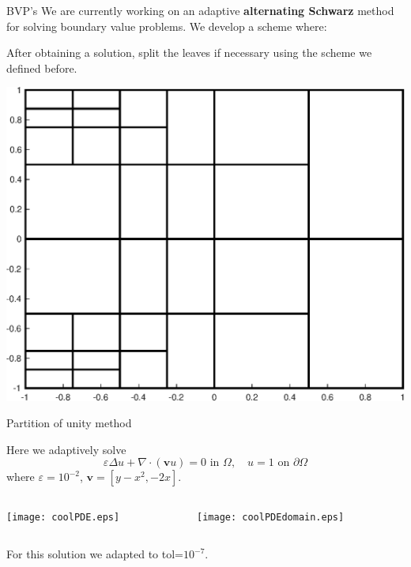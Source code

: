 \documentclass{beamer}
\newcommand{\vect}[1]{\mathbf{#1}}
\begin{document}
\begin{frame}{BVP's}
		We are currently working on an adaptive \textbf{alternating Schwarz} method for solving boundary value problems. We develop a scheme where:
\bigskip

		After obtaining a solution, split the leaves if necessary using the scheme we defined before.
\bigskip

	\begin{center}
		\includegraphics[scale = 0.3]{zonePlot2.eps}
	\end{center}
\end{frame}

\begin{frame}{Partition of unity method}

Here we adaptively solve
$$
\varepsilon \Delta u + \nabla\cdot(\vect{v} u) = 0 \text{ in } \Omega, \quad u=1 \text{ on } \partial\Omega
$$
\bigskip
where $\varepsilon=10^{-2}$, $\vect{v}=[y-x^2,-2x]$.
\begin{columns}[t]

\begin{column}{0.5\textwidth}	
\begin{center}
\texttt{[image: coolPDE.eps]}	
\end{center}
\end{column}

\begin{column}{0.5\textwidth}
\begin{center}
\texttt{[image: coolPDEdomain.eps]}	
\end{center}
\end{column}

\end{columns}

\begin{center}
For this solution we adapted to tol=$10^{-7}$.
\end{center}

\end{frame}
\end{document}
